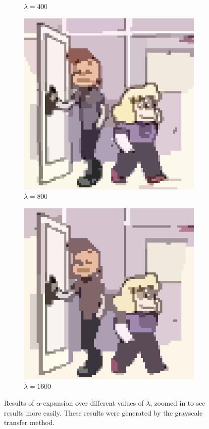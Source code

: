 \documentclass[10pt,twocolumn,letterpaper]{article}
\begin{document}
\begin{figure}
\begin{subfigure}{.48\linewidth}
\caption{$\lambda = 400$}
\end{subfigure}
\begin{subfigure}{.48\linewidth}
\includegraphics[width=\linewidth]{alphaResults/sadylars_large_0800.png}
\caption{$\lambda = 800$}
\end{subfigure}
\begin{subfigure}{.48\linewidth}
\includegraphics[width=\linewidth]{alphaResults/sadylars_large_1600.png}
\caption{$\lambda = 1600$}
\end{subfigure}
\caption{Results of $\alpha$-expansion over different values of $\lambda$, zoomed in to see results more easily. These results were generated by the grayscale transfer method.}
\label{fig:alphaResultsSadylars}
\end{figure}
\end{document}
